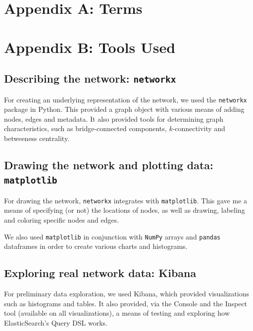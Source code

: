 \documentclass{finalreport}
\begin{document}
\pagebreak

\printbibheading
\printbibliography[keyword=major,heading=subbibliography,title={Primary Sources}]
\printbibliography[keyword=minor,heading=subbibliography,title={Further Reading}]

\section{Appendix A: Terms}\label{app:gloss}

\printnoidxglossaries

\section{Appendix B: Tools Used}\label{app:tools}

\subsection{Describing the network: \texttt{networkx}}\label{nx}

For creating an underlying representation of the network, we used the \texttt{networkx}\cite{nx} package in Python. This provided a graph object with various means of adding nodes, edges and metadata. It also provided tools for determining graph characteristics, such as bridge-connected components\cite{nxb}, $k$-connectivity\cite{nxk} and betweeness centrality\cite{nxc}.

\subsection{Drawing the network and plotting data: \texttt{matplotlib}}\label{mpl}

For drawing the network, \texttt{networkx}\cite{nx} integrates with \texttt{matplotlib}\cite{mpl}. This gave me a means of specifying (or not) the locations of nodes, as well as drawing, labeling and coloring specific nodes and edges.

We also used \texttt{matplotlib} in conjunction with \texttt{NumPy}\cite{np} arrays and \texttt{pandas}\cite{pd} dataframes in order to create various charts and histograms.

\subsection{Exploring real network data: Kibana}\label{kibana}

For preliminary data exploration, we used Kibana\cite{kibana}, which provided visualizations such as histograms and tables. It also provided, via the Console and the Inspect tool (available on all visualizations), a means of testing and exploring how ElasticSearch's Query DSL\cite{query} works.
\end{document}
